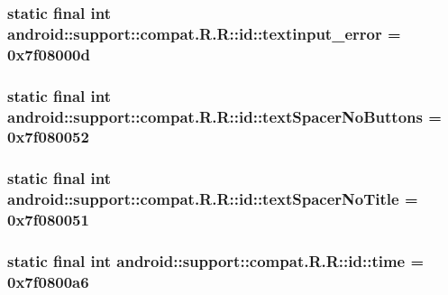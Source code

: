 \hypertarget{classandroid_1_1support_1_1compat_1_1_r_1_1id_bc2a8ee3d3f86eb088566784c32ecb28}{
\subsubsection[{textinput\_\-error}]{\setlength{\rightskip}{0pt plus 5cm}static final int android::support::compat.R.R::id::textinput\_\-error = 0x7f08000d}}
\label{classandroid_1_1support_1_1compat_1_1_r_1_1id_bc2a8ee3d3f86eb088566784c32ecb28}


\hypertarget{classandroid_1_1support_1_1compat_1_1_r_1_1id_392acc7476e6190da835e22b220ea9f2}{
\subsubsection[{textSpacerNoButtons}]{\setlength{\rightskip}{0pt plus 5cm}static final int android::support::compat.R.R::id::textSpacerNoButtons = 0x7f080052}}
\label{classandroid_1_1support_1_1compat_1_1_r_1_1id_392acc7476e6190da835e22b220ea9f2}


\hypertarget{classandroid_1_1support_1_1compat_1_1_r_1_1id_24ac1de7feafccc5851b0a1eb02bfa42}{
\subsubsection[{textSpacerNoTitle}]{\setlength{\rightskip}{0pt plus 5cm}static final int android::support::compat.R.R::id::textSpacerNoTitle = 0x7f080051}}
\label{classandroid_1_1support_1_1compat_1_1_r_1_1id_24ac1de7feafccc5851b0a1eb02bfa42}


\hypertarget{classandroid_1_1support_1_1compat_1_1_r_1_1id_158e6eeea1543b0d6dc680b4fbd7cede}{
\subsubsection[{time}]{\setlength{\rightskip}{0pt plus 5cm}static final int android::support::compat.R.R::id::time = 0x7f0800a6}}
\label{classandroid_1_1support_1_1compat_1_1_r_1_1id_158e6eeea1543b0d6dc680b4fbd7cede}


